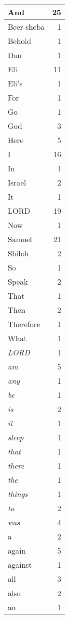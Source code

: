 \begin{center}
\begin{longtable}{l|r}
\hline \hline
\endlastfoot
And & 25 \\ \hline
Beer-sheba & 1 \\ \hline
Behold & 1 \\ \hline
Dan & 1 \\ \hline
Eli & 11 \\ \hline
Eli's & 1 \\ \hline
For & 1 \\ \hline
Go & 1 \\ \hline
God & 3 \\ \hline
Here & 5 \\ \hline
I & 16 \\ \hline
In & 1 \\ \hline
Israel & 2 \\ \hline
It & 1 \\ \hline
LORD & 19 \\ \hline
Now & 1 \\ \hline
Samuel & 21 \\ \hline
Shiloh & 2 \\ \hline
So & 1 \\ \hline
Speak & 2 \\ \hline
That & 1 \\ \hline
Then & 2 \\ \hline
Therefore & 1 \\ \hline
What & 1 \\ \hline
\emph{LORD} & 1 \\ \hline
\emph{am} & 5 \\ \hline
\emph{any} & 1 \\ \hline
\emph{be} & 1 \\ \hline
\emph{is} & 2 \\ \hline
\emph{it} & 1 \\ \hline
\emph{sleep} & 1 \\ \hline
\emph{that} & 1 \\ \hline
\emph{there} & 1 \\ \hline
\emph{the} & 1 \\ \hline
\emph{things} & 1 \\ \hline
\emph{to} & 2 \\ \hline
\emph{was} & 4 \\ \hline
a & 2 \\ \hline
again & 5 \\ \hline
against & 1 \\ \hline
all & 3 \\ \hline
also & 2 \\ \hline
an & 1 \\ \hline

\end{longtable}
\end{center}
